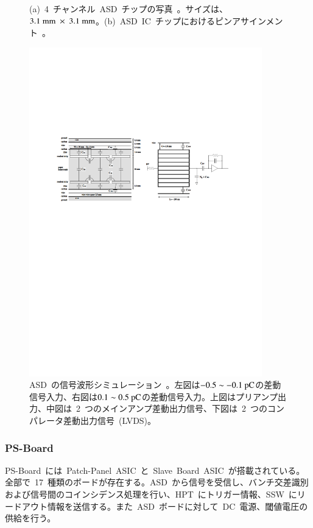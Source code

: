 \begin{figure}[H]
\begin{minipage}{0.49\hsize}
        \subcaption{}
        \end{minipage}
        \caption[ASD~チップの詳細]{(a)~4~チャンネル~ASD~チップの写真~\cite{URL:06}。サイズは、$3.1~\rm{mm}~\times~3.1~\rm{mm}$。(b)~ASD~IC~チップにおけるピンアサインメント~\cite{URL:06}。}\label{fig:ASD}
\end{figure}

\begin{figure}[H]
        \centering   
        \includegraphics[width=0.9\textwidth,page=2]{img/pdf/ASD.pdf}
        \caption[ASD~の信号波形シミュレーション]{ASD~の信号波形シミュレーション~\cite{URL:06}。左図は$\rm{-0.5\sim-0.1}~\rm{pC}$の差動信号入力、右図は$\rm{0.1\sim0.5}~\rm{pC}$の差動信号入力。上図はプリアンプ出力、中図は~2~つのメインアンプ差動出力信号、下図は~2~つのコンパレータ差動出力信号~(LVDS)。}
        \label{fig:signal}
\end{figure}

\subsubsection{PS-Board}
PS-Board~には~Patch-Panel~ASIC~と~Slave~Board~ASIC~が搭載されている。全部で~17~種類のボードが存在する。ASD~から信号を受信し、バンチ交差識別および信号間のコインシデンス処理を行い、HPT~にトリガー情報、SSW~にリードアウト情報を送信する。また~ASD~ボードに対して~DC~電源、閾値電圧の供給を行う。

